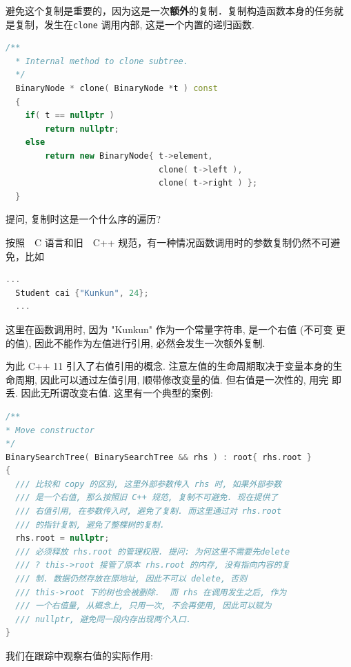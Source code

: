 \documentclass[a4paper]{ctexart}
\theoremstyle{definition}
\theoremstyle{definition}
\begin{document}
避免这个复制是重要的，因为这是一次{\bf 额外}的复制．复制构造函数本身的任务就
是复制，发生在\verb|clone| 调用内部, 这是一个内置的递归函数.

\begin{lstlisting}[language=C++]
  /**
  * Internal method to clone subtree.
  */
  BinaryNode * clone( BinaryNode *t ) const
  {
    if( t == nullptr )
        return nullptr;
    else
        return new BinaryNode{ t->element,
                               clone( t->left ),
                               clone( t->right ) };
  }
\end{lstlisting}

提问, 复制时这是一个什么序的遍历?

按照　C 语言和旧　C++ 规范，有一种情况函数调用时的参数复制仍然不可避免，比如
\begin{lstlisting}[language=C++]
  ...
  Student cai {"Kunkun", 24};
  ...
\end{lstlisting}
这里在函数调用时, 因为 "Kunkun" 作为一个常量字符串, 是一个右值 (不可变
更的值), 因此不能作为左值进行引用, 必然会发生一次额外复制.

为此 C++ 11 引入了右值引用的概念. 注意左值的生命周期取决于变量本身的生
命周期, 因此可以通过左值引用, 顺带修改变量的值. 但右值是一次性的, 用完
即丢. 因此无所谓改变右值. 这里有一个典型的案例:

\begin{lstlisting}[language=C++]
/**
* Move constructor
*/
BinarySearchTree( BinarySearchTree && rhs ) : root{ rhs.root }
{
  /// 比较和 copy 的区别, 这里外部参数传入 rhs 时, 如果外部参数
  /// 是一个右值, 那么按照旧 C++ 规范, 复制不可避免. 现在提供了
  /// 右值引用, 在参数传入时, 避免了复制. 而这里通过对 rhs.root
  /// 的指针复制, 避免了整棵树的复制. 
  rhs.root = nullptr;
  /// 必须释放 rhs.root 的管理权限. 提问: 为何这里不需要先delete
  /// ? this->root 接管了原本 rhs.root 的内存, 没有指向内容的复
  /// 制. 数据仍然存放在原地址, 因此不可以 delete, 否则
  /// this->root 下的树也会被删除.  而 rhs 在调用发生之后, 作为
  /// 一个右值量, 从概念上, 只用一次, 不会再使用, 因此可以赋为
  /// nullptr, 避免同一段内存出现两个入口.
}
\end{lstlisting}

我们在跟踪中观察右值的实际作用:
\end{document}
